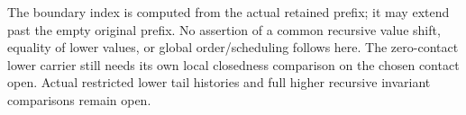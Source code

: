 The boundary index is computed from the actual retained prefix; it may extend
past the empty original prefix.  No assertion of a common recursive value
shift, equality of lower values, or global order/scheduling follows here.
The zero-contact lower carrier still needs its own local closedness comparison
on the chosen contact open.  Actual restricted lower tail histories and full
higher recursive invariant comparisons remain open.
